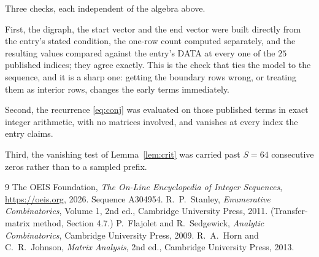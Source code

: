 \documentclass[11pt,a4paper]{article}
\theoremstyle{plain}
\theoremstyle{definition}
\begin{document}
Three checks, each independent of the algebra above.

First, the digraph, the start vector and the end vector were built directly from the
entry's stated condition, the one-row count computed separately, and the resulting values
compared against the entry's DATA at every one of the $25$ published indices; they
agree exactly. This is the check that ties the model to the sequence, and it is a sharp one:
getting the boundary rows wrong, or treating them as interior rows, changes the early terms
immediately.

Second, the recurrence \eqref{eq:conj} was evaluated on those published terms in exact
integer arithmetic, with no matrices involved, and vanishes at every index the entry claims.

Third, the vanishing test of Lemma~\ref{lem:crit} was carried past $S=64$ consecutive
zeros rather than to a sampled prefix.

\begin{thebibliography}{9}
 The OEIS Foundation, \emph{The On-Line Encyclopedia of Integer
Sequences}, \url{https://oeis.org}, 2026. Sequence A304954.
 R.~P.~Stanley, \emph{Enumerative Combinatorics}, Volume 1, 2nd ed.,
Cambridge University Press, 2011. (Transfer-matrix method, Section 4.7.)
 P.~Flajolet and R.~Sedgewick, \emph{Analytic Combinatorics}, Cambridge
University Press, 2009.
 R.~A.~Horn and C.~R.~Johnson, \emph{Matrix Analysis}, 2nd ed., Cambridge
University Press, 2013.
\end{thebibliography}
\end{document}

